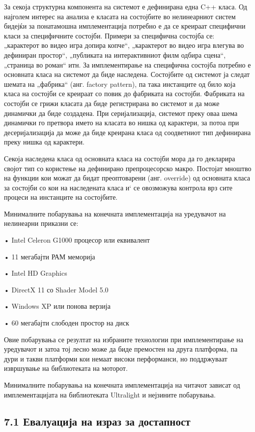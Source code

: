 За секоја структурна компонента на системот е дефинирана една C++ класа. Од најголем интерес на анализа е класата на состојбите во нелинеарниот систем бидејќи за понатамошна имплементација потребно е да се креираат специфични класи за специфичните состојби. Примери за специфична состојба се: „карактерот во видео игра допира копче“, „карактерот во видео игра влегува во дефиниран простор“, „публиката на интерактивниот филм одбира сцена“, „страница во роман“ итн. За имплементирање на специфична состојба потребно е основната класа на системот да биде наследена. Состојбите од системот ја следат шемата на „фабрика“ (анг. factory pattern), па така инстанците од било која класа на состојби се креираат со повик до фабриката на состојби. Фабриката на состојби се грижи класата да биде регистрирана во системот и да може динамички да биде создадена. При серијализација, системот преку оваа шема динамички го претвора името на класата во нишка од карактери, за потоа при десеријализација да може да биде креирана класа од соодветниот тип дефинирана преку нишка од карактери.

Секоја наследена класа од основната класа на состојби мора да го декларира својот тип со користење на дефинирано препроцесорско макро. Постојат мноштво на функции кои можат да бидат преоптоварени (анг. override) од основната класа за состојби со кои на наследената класа и` се овозможува контрола врз сите процеси на инстанците на состојбите.

Минималните побарувања на конечната имплементација на уредувачот на нелинеарни приказни се:

• Intel Celeron G1000 процесор или еквивалент

• 11 мегабајти РАМ меморија

• Intel HD Graphics

• DirectX 11 со Shader Model 5.0

• Windows XP или понова верзија

• 60 мегабајти слободен простор на диск

Овие побарувања се резултат на избраните технологии при имплементирање на уредувачот и затоа тој лесно може да биде премостен на друга платформа, па дури и такви платформи кои немаат високи перформанси, но поддржуваат извршување на библиотеката на моторот.

Минималните побарувања на конечната имплементација на читачот зависат од имплементацијата на библиотеката Ultralight и нејзините побарувања.

\subsection{7.1 Евалуација на израз за достапност}

